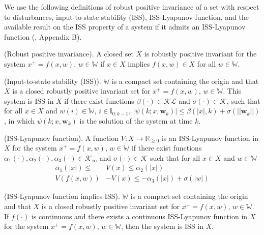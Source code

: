 \documentclass[preprint,5p, twocolumn, authoryear]{elsarticle}
\newcommand{\bbR}{\mathbb{R}}
\newcommand{\bbW}{\mathbb{W}}
\newcommand{\bbI}{\mathbb{I}}
\begin{document}
We use the following
definitions of
robust positive invariance of a set
with respect to disturbances, 
input-to-state stability (ISS), ISS-Lyapunov function,
and the available result 
on the ISS property of a system if it admits 
an ISS-Lyapunov function
(\cite*{jiang:wang:2001, 
rawlings:mayne:diehl:2017}, Appendix B).

\begin{definition} \label{def:robust_pos_invariance}
(Robust positive invariance). A closed set $X$ is 
robustly positive invariant for the system $x^+ = f(x, w)$, 
$w \in \bbW$ if $x \in X$ 
implies $f(x, w) \in X$ for all $w \in \bbW$.
\end{definition}

\begin{definition} \label{def:iss}
(Input-to-state stability (ISS)). $\bbW$ is a compact 
set containing the origin and that $X$ is a closed robustly
positive invariant set for $x^+ = f(x, w)$, $w \in \bbW$. This
system is ISS in $X$ if there exist functions 
$\beta(\cdot) \in \mathcal{K}\mathcal{L}$ and 
$\sigma(\cdot) \in \mathcal{K}$, such that for all
$x \in X$ and $w(i) \in \bbW$, $i \in \bbI_{0:k-1}$, 
$\vert \psi(k; x, \mathbf{w}_k) \vert \leq \beta(\vert x\vert, k) 
+ \sigma(\vert \vert \mathbf{w}_k\vert \vert)$, in which 
$\psi(k; x, \mathbf{w}_k)$ is the solution of the system 
at time $k$.
\end{definition}

\begin{definition} \label{def:iss_lyapunov_func}
(ISS-Lyapunov function). A function $V : X \rightarrow \bbR_{\geq 0}$
is an ISS-Lyapunov function in $X$ for the system $x^+ = f(x, w)$, $w \in \bbW$
if there exist functions $\alpha_1(\cdot), \alpha_2(\cdot), \alpha_3(\cdot) 
\in \mathcal{K}_{\infty}$ and $\sigma(\cdot) \in \mathcal{K}$
such that for all $x \in X$ and $w \in \bbW$
\begin{align*}
    \alpha_1(\vert x \vert) \leq & V(x) \leq \alpha_2(\vert x \vert) \\
    V(f(x, w)) &- V(x) \leq -\alpha_3(\vert x \vert) + \sigma(\vert w \vert)
\end{align*}
\end{definition}

\begin{prop} \label{prop:lyapunov_implies_iss}
(ISS-Lyapunov function implies ISS). $\bbW$ is a compact
set containing the origin and that $X$ is a closed robustly
positive invariant set for $x^+ = f(x, w)$, $w \in \bbW$. If 
$f(\cdot)$ is continuous and there exists a continuous 
ISS-Lyapunov function in $X$ for the system $x^+ = f(x, w)$, $w \in \bbW$, 
then the system is ISS in $X$.
\end{prop}
\end{document}
